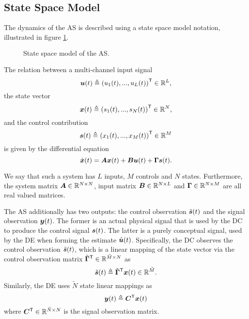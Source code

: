 \subsection{State Space Model}
The dynamics of the AS is described using a state space model notation, illustrated in figure \ref{fig:as_state_space_model}.

\begin{figure}[htbp]
    
    \centering
    \caption{State space model of the AS.}
    \label{fig:as_state_space_model}
\end{figure}

The relation between a multi-channel input signal
\begin{equation}
    \label{eq:def_input_sig}
    \bm{u}(t) \triangleq \left( u_1(t),..., u_L(t) \right)^\mathsf{T} \in \mathbb{R}^L,
\end{equation}
the state vector
\begin{equation}
    \label{eq:def_state_vector}
    \bm{x}(t) \triangleq \left( s_1(t),..., s_N(t) \right)^\mathsf{T} \in \mathbb{R}^N,
\end{equation}
and the control contribution
\begin{equation}
    \label{eq:def_control_contribution}
    \bm{s}(t) \triangleq \left( x_1(t),..., x_M(t) \right)^\mathsf{T} \in \mathbb{R}^M
\end{equation}
is given by the differential equation
\begin{equation}
    \label{eq:state_space_equations}
    \dot{\bm{x}}(t) = \bm{A}\bm{x}(t) + \bm{B}\bm{u}(t) + \bm{\Gamma}\bm{s}(t).
\end{equation}

We say that such a system has $L$ inputs, $M$ controls and $N$ states.
Furthermore, the system matrix $\bm{A} \in \mathbb{R}^{N \times N}$, input matrix $\bm{B} \in \mathbb{R}^{N \times L}$ and $\bm{\Gamma} \in \mathbb{R}^{N \times M}$ are all real valued matrices.

The AS additionally has two outputs: the control observation $\tilde{\bm{s}}(t)$ and the signal observation $\bm{y}(t)$. The former is an actual physical signal that is used by the DC to produce the control signal $\bm{s}(t)$. The latter is a purely conceptual signal, used by the DE when forming the estimate $\hat{\bm{u}}(t)$. Specifically, the DC observes the control observation $\tilde{\bm{s}}(t)$, which is a linear mapping of the state vector via the control observation matrix $\tilde{\bm{\Gamma}}^\mathsf{T} \in \mathbb{R}^{\tilde{M} \times N}$ as
\begin{equation}
    \label{eq:def_control_observation}
    \tilde{\bm{s}}(t) \triangleq \tilde{\bm{\Gamma}}^\mathsf{T} \bm{x}(t) \in \mathbb{R}^{\tilde{M}}.
\end{equation}
Similarly, the DE uses $\tilde{N}$ state linear mappings as
\begin{equation}
    \label{eq:def_as_output}
    \bm{y}(t) \triangleq \bm{C}^\mathsf{T} \bm{x}(t)
\end{equation}
where $\bm{C}^\mathsf{T} \in \mathbb{R}^{\tilde{N} \times N}$ is the signal observation matrix.

